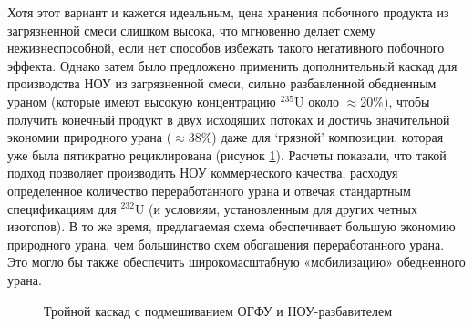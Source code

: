 Хотя этот вариант и кажется идеальным, цена хранения побочного продукта из загрязненной смеси слишком высока, что мгновенно делает схему нежизнеспособной, если нет способов избежать такого негативного побочного эффекта.
Однако затем было предложено применить дополнительный каскад для производства НОУ из загрязненной смеси, сильно разбавленной обедненным ураном (которые имеют высокую концентрацию $^{235}$U около $\approx$20\%), чтобы получить конечный продукт в двух исходящих потоках и достичь значительной экономии природного урана ($\approx$38\%) даже для `грязной' композиции, которая уже была пятикратно рециклирована (рисунок \ref{fig:Tomsk}). Расчеты показали, что такой подход позволяет производить НОУ коммерческого качества, расходуя определенное количество переработанного урана и отвечая стандартным спецификациям для  $^{232}$U (и условиям, установленным для других четных изотопов). В то же время, предлагаемая схема обеспечивает большую экономию природного урана, чем большинство схем обогащения переработанного урана. Это могло бы также обеспечить широкомасштабную «мобилизацию» обедненного урана.

\begin{figure}[ht]
  \caption{Тройной каскад с подмешиванием ОГФУ и НОУ-разбавителем}\label{fig:Tomsk}
\end{figure}

